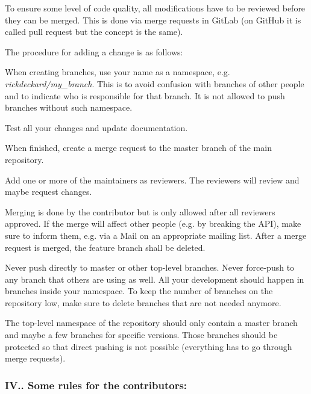 To ensure some level of code quality, all modifications have to be reviewed before they can be merged. This is done via merge requests in Git\+Lab (on Git\+Hub it is called pull request but the concept is the same).

The procedure for adding a change is as follows\+:


\begin{DoxyItemize}
\item When creating branches, use your name as a namespace, e.\+g. {\itshape rickdeckard/my\+\_\+branch}. This is to avoid confusion with branches of other people and to indicate who is responsible for that branch. It is not allowed to push branches without such namespace.
\item Test all your changes and update documentation.
\item When finished, create a merge request to the master branch of the main repository.
\item Add one or more of the maintainers as reviewers. The reviewers will review and maybe request changes.
\item Merging is done by the contributor but is only allowed after all reviewers approved. If the merge will affect other people (e.\+g. by breaking the A\+PI), make sure to inform them, e.\+g. via a Mail on an appropriate mailing list. After a merge request is merged, the feature branch shall be deleted.
\end{DoxyItemize}

Never push directly to master or other top-\/level branches. Never force-\/push to any branch that others are using as well. All your development should happen in branches inside your namespace. To keep the number of branches on the repository low, make sure to delete branches that are not needed anymore.

The top-\/level namespace of the repository should only contain a master branch and maybe a few branches for specific versions. Those branches should be protected so that direct pushing is not possible (everything has to go through merge requests).

\subsubsection*{I\+V.. Some rules for the contributors\+:}


